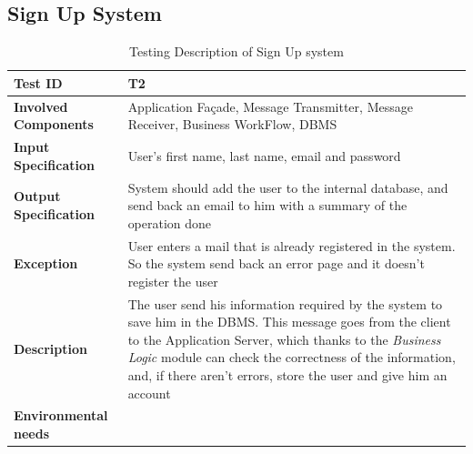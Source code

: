 \subsection*{Sign Up System}

\begin{table}[H]
    \centering
    \begin{tabular}{p{4.55cm} p{7cm}}
        
        \hline
        
        \textbf{Test ID}                & T2 \\
        
        \hline
        
        \textbf{Involved Components}    & Application Façade, Message Transmitter, Message Receiver, Business                                          WorkFlow, DBMS\\
        
        \hline
        
        \textbf{Input Specification}    & User's first name, last name, email and password\\
        
        \hline
        
        \textbf{Output Specification}   & System should add the user to the internal database, and send back an email to him with a summary of the operation done\\
        
        \hline
        
        \textbf{Exception}              & User enters a mail that is already registered in the system. So the system send back an error page and it doesn't register the user\\
        
        \hline
        
        \textbf{Description}            & The user send his information required by the system to save him in the DBMS. This message goes from the client to the Application Server, which thanks to the \emph{Business Logic} module can check the correctness of the information, and, if there aren't errors, store the user and give him an account\\
        
        \hline
        
        \textbf{Environmental needs}    & \\
        
        \hline
        
    \end{tabular}
    \caption{Testing Description of Sign Up system}
\end{table}



